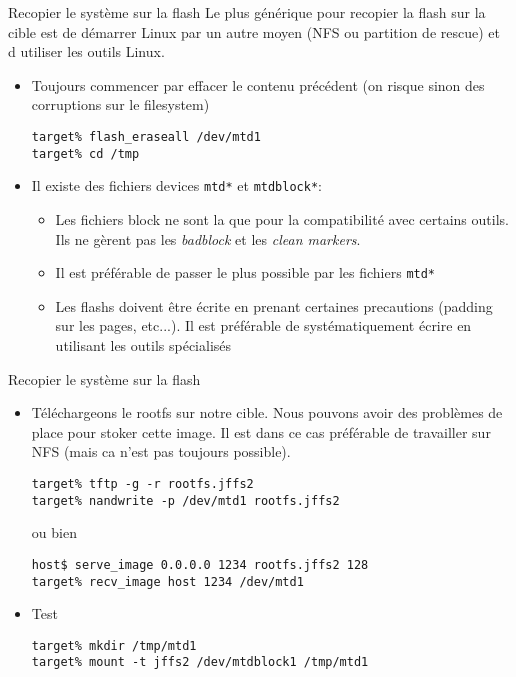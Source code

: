 \begin{frame}[fragile=singleslide]{Recopier le système sur la flash}
  Le  plus  générique pour  recopier  la flash  sur  la  cible est  de
  démarrer Linux par un autre moyen  (NFS ou partition de rescue) et d
  utiliser les outils Linux.
  \begin{itemize} 
  \item Toujours commencer par effacer le contenu précédent (on risque
    sinon des corruptions sur le filesystem)
    \begin{lstlisting}
target% flash_eraseall /dev/mtd1
target% cd /tmp
    \end{lstlisting}
  \item    Il   existe   des    fichiers   devices    \verb+mtd*+   et
    \verb+mtdblock*+:
    \begin{itemize} 
    \item Les fichiers block ne sont la que pour la compatibilité avec
      certains outils.  Ils ne gèrent  pas les \emph{badblock}  et les
      \emph{clean markers}.
    \item  Il  est préférable  de  passer  le  plus possible  par  les
      fichiers \verb+mtd*+
    \item  Les  flashs  doivent   être  écrite  en  prenant  certaines
      precautions (padding  sur les pages, etc...).  Il est préférable
      de systématiquement écrire en utilisant les outils spécialisés
    \end{itemize} 
  \end{itemize}
\end{frame}

\begin{frame}[fragile=singleslide]{Recopier le système sur la flash}
  \begin{itemize} 
  \item Téléchargeons  le rootfs sur  notre cible. Nous  pouvons avoir
    des problèmes  de place pour stoker  cette image.  Il  est dans ce
    cas préférable de  travailler sur NFS (mais ca  n'est pas toujours
    possible).
    \begin{lstlisting} 
target% tftp -g -r rootfs.jffs2
target% nandwrite -p /dev/mtd1 rootfs.jffs2
    \end{lstlisting}
    ou bien
    \begin{lstlisting} 
host$ serve_image 0.0.0.0 1234 rootfs.jffs2 128
target% recv_image host 1234 /dev/mtd1
    \end{lstlisting} 
  \item  Test
    \begin{lstlisting}
target% mkdir /tmp/mtd1
target% mount -t jffs2 /dev/mtdblock1 /tmp/mtd1
    \end{lstlisting} 
  \end{itemize}
\end{frame}

